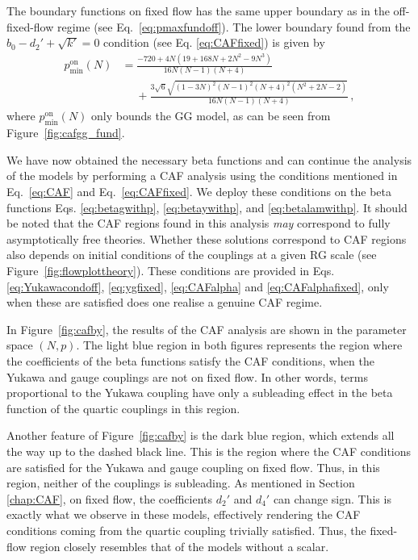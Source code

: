 The boundary functions on fixed flow has the same upper boundary as in the off-fixed-flow regime (see Eq.~\eqref{eq:pmaxfundoff}). The lower boundary found from the $b_0-d_2'+\sqrt{k'}=0$ condition (see Eq. \eqref{eq:CAFfixed}) is given by
\begin{align}
    p_{\text{min}}^\text{on}(N)&= \frac{-720 + 4N(19 + 168N + 2N^2 - 9N^3)}{16N(N - 1)(N + 4)}\nonumber\\&\quad\;+\frac{ 3\sqrt{6}\sqrt{(1 - 3N)^2(N - 1)^2(N + 4)^2(N^2 + 2N - 2)}}{16N(N - 1)(N + 4)}\label{eq:pminfundon}\,,
\end{align}
where $p_{\text{min}}^\text{on}(N)$ only bounds the GG model, as can be seen from Figure~\ref{fig:cafgg_fund}.

We have now obtained the necessary beta functions and can continue the analysis of the models by performing a CAF analysis using the conditions mentioned in Eq.~\eqref{eq:CAF} and Eq.~\eqref{eq:CAFfixed}. We deploy these conditions on the beta functions Eqs. \eqref{eq:betagwithp}, \eqref{eq:betaywithp}, and \eqref{eq:betalamwithp}. It should be noted that the CAF regions found in this analysis \textit{may} correspond to fully asymptotically free theories. Whether these solutions correspond to CAF regions also depends on initial conditions of the couplings at a given RG scale (see Figure~\ref{fig:flowplottheory}). These conditions are provided in Eqs. \eqref{eq:Yukawacondoff}, \eqref{eq:ygfixed}, \eqref{eq:CAFalpha} and \eqref{eq:CAFalphafixed}, only when these are satisfied does one realise a genuine CAF regime. 

In Figure~\ref{fig:cafby}, the results of the CAF analysis are shown in the parameter space $(N,p)$. The light blue region in both figures represents the region where the coefficients of the beta functions satisfy the CAF conditions, when the Yukawa and gauge couplings are not on fixed flow. In other words, terms proportional to the Yukawa coupling have only a subleading effect in the beta function of the quartic couplings in this region.

Another feature of Figure~\ref{fig:cafby} is the dark blue region, which extends all the way up to the dashed black line. This is the region where the CAF conditions are satisfied for the Yukawa and gauge coupling on fixed flow. Thus, in this region, neither of the couplings is subleading. As mentioned in Section \ref{chap:CAF}, on fixed flow, the coefficients $d_2'$ and $d_4'$ can change sign. This is exactly what we observe in these models, effectively rendering the CAF conditions coming from the quartic coupling trivially satisfied. Thus, the fixed-flow region closely resembles that of the models without a scalar. 


